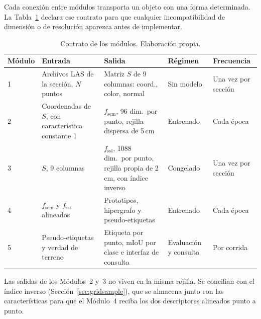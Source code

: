 Cada conexión entre módulos transporta un objeto con una forma determinada. La
Tabla~\ref{tab:contrato} declara ese contrato para que cualquier
incompatibilidad de dimensión o de resolución aparezca antes de implementar.

\begin{table}[!htbp]
\centering
{}\small
\setlength{\tabcolsep}{4pt}
\caption[Contrato de los módulos]{Contrato de los módulos. Elaboración propia.}
\label{tab:contrato}
\begin{tabularx}{\linewidth}{@{}l>{\raggedright\arraybackslash}X>{\raggedright\arraybackslash}X>{\raggedright\arraybackslash}p{1.9cm}>{\raggedright\arraybackslash}p{2.0cm}@{}}
\toprule
\textbf{Módulo} & \textbf{Entrada} & \textbf{Salida} & \textbf{Régimen} & \textbf{Frecuencia} \\
\midrule
1 & Archivos LAS de la sección, $N$ puntos & Matriz $S$ de 9 columnas: coord., color, normal & Sin modelo & Una vez por sección \\
2 & Coordenadas de $S$, con característica constante 1 & $f_{\mathrm{sem}}$, 96 dim.\ por punto, rejilla dispersa de 5\,cm & Entrenado & Cada época \\
3 & $S$, 9 columnas & $f_{\mathrm{ssl}}$, 1088 dim.\ por punto, rejilla propia de 2\,cm, con índice inverso & Congelado & Una vez por sección \\
4 & $f_{\mathrm{sem}}$ y $f_{\mathrm{ssl}}$ alineados & Prototipos, hipergrafo y pseudo-etiquetas & Entrenado & Cada época \\
5 & Pseudo-etiquetas y verdad de terreno & Etiqueta por punto, mIoU por clase e interfaz de consulta & Evaluación y consulta & Por corrida \\
\bottomrule
\end{tabularx}
\end{table}

Las salidas de los Módulos~2 y~3 no viven en la misma rejilla. Se concilian con
el índice inverso (Sección~\ref{sec:gridsample}), que se almacena junto con las
características para que el Módulo~4 reciba los dos descriptores alineados punto
a punto.


